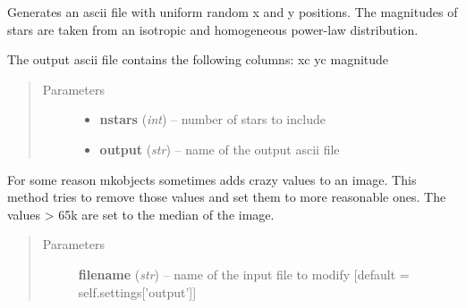 \documentclass[a4paper,12pt,english]{sphinxmanual}
\begin{document}
\begin{fulllineitems}
\begin{fulllineitems}
\begin{quote}
\begin{description}
\end{description}\end{quote}

\end{fulllineitems}


\begin{fulllineitems}
\label{simulator:simulator.generateGalaxies.generateFakeData.createStarlist}
Generates an ascii file with uniform random x and y positions.
The magnitudes of stars are taken from an isotropic and homogeneous power-law distribution.

The output ascii file contains the following columns: xc yc magnitude
\begin{quote}\begin{description}
\item[{Parameters}] \leavevmode\begin{itemize}
\item {} 
\textbf{nstars} (\emph{int}) -- number of stars to include

\item {} 
\textbf{output} (\emph{str}) -- name of the output ascii file

\end{itemize}

\end{description}\end{quote}

\end{fulllineitems}


\begin{fulllineitems}
\label{simulator:simulator.generateGalaxies.generateFakeData.maskCrazyValues}
For some reason mkobjects sometimes adds crazy values to an image.
This method tries to remove those values and set them to more reasonable ones.
The values \textgreater{} 65k are set to the median of the image.
\begin{quote}\begin{description}
\item[{Parameters}] \leavevmode
\textbf{filename} (\emph{str}) -- name of the input file to modify {[}default = self.settings{[}'output'{]}{]}


\end{description}
\end{quote}
\end{fulllineitems}
\end{fulllineitems}
\end{document}
